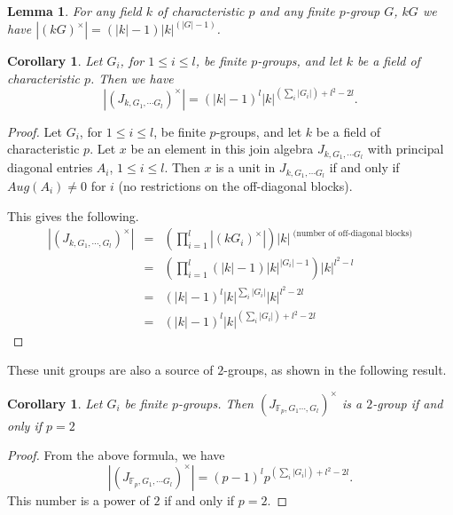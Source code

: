 \documentclass[12pt, a4paper]{amsart}
\numberwithin{equation}{section} %
\theoremstyle{plain}
\theoremstyle{definition}
\theoremstyle{plain}
\newtheorem{lem}[thm]{Lemma}
\newtheorem{cor}[thm]{Corollary}
\theoremstyle{remark}
\begin{document}
\begin{lem}
 For any field $k$ of characteristic $p$ and any finite $p$-group $G$,
 $kG$ we have $|(kG)^\times| = (|k|-1) |k|^{(|G|-1)}$.
\end{lem}




\begin{cor}
Let $G_i$, for $1 \le i \le l$, be  finite $p$-groups, and let $k$ be a field of characteristic $p$. Then we have
\[|(J_{k, G_1, \cdots G_l})^\times| = (|k|-1)^l|k|^{(\sum_i |G_i|)+l^2-2l}.\]
\end{cor}

\begin{proof}

Let $G_i$, for $1 \le i \le l$, be  finite $p$-groups, and let $k$ be a field of characteristic $p$. Let $x$ be an element in this join algebra $J_{k, G_1, \cdots G_l}$ with principal diagonal entries $A_i$, $1 \le i \le l$.  Then $x$ is a unit  in $J_{k, G_1, \cdots G_l}$  if and only if $Aug(A_i) \ne 0$ for $i$ (no restrictions on the off-diagonal blocks).

This gives the following.
\begin{eqnarray*}
 |(J_{k, G_1, \cdots, G_l})^\times| &= & \left( \prod_{i=1}^l |(kG_i)^\times| \right)  |k|^{\text{ (number of off-diagonal blocks)}} \\
 & = & \left( \prod_{i=1}^l (|k|-1)|k|^{|G_i|-1} \right) |k|^{l^2-l}\\
 & = & (|k|-1)^l|k|^{\sum_i |G_i|}|k|^{l^2-2l} \\
 & = & (|k|-1)^l|k|^{(\sum_i |G_i|)+l^2-2l}
\end{eqnarray*}
\end{proof}

These unit groups are also a source of  $2$-groups, as shown in the following result.

\begin{cor}
Let $G_i$ be  finite $p$-groups. Then $(J_{\mathbb{F}_p, G_1 \cdots, G_l})^\times$ is a $2$-group if and only if $p=2$
\end{cor}
\begin{proof}
From the above formula, we have 
\[|(J_{\mathbb{F}_p, G_1, \cdots G_l})^\times | = (p-1)^l p^{(\sum_i |G_i|)+l^2-2l}. \]
This number is a power of $2$ if and only if $p=2$.
\end{proof}
\end{document}
